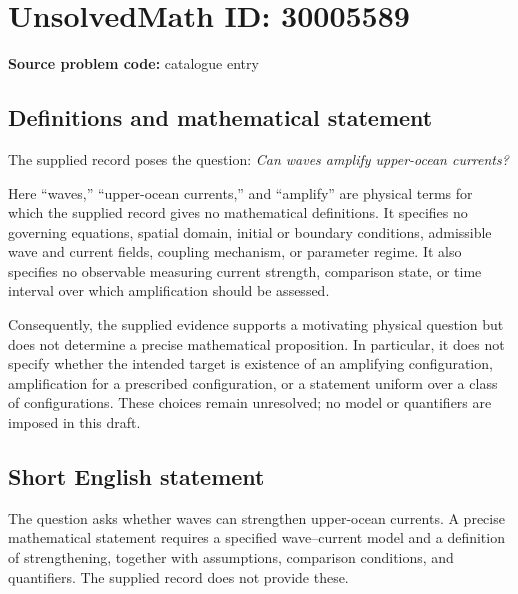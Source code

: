 \documentclass[11pt]{article}
\begin{document}
\section*{UnsolvedMath ID: 30005589}
\textbf{Source problem code:} catalogue entry
\subsection{Definitions and mathematical statement}
The supplied record poses the question: \emph{Can waves amplify upper-ocean currents?}

Here ``waves,'' ``upper-ocean currents,'' and ``amplify'' are physical terms for which the supplied record gives no mathematical definitions. It specifies no governing equations, spatial domain, initial or boundary conditions, admissible wave and current fields, coupling mechanism, or parameter regime. It also specifies no observable measuring current strength, comparison state, or time interval over which amplification should be assessed.

Consequently, the supplied evidence supports a motivating physical question but does not determine a precise mathematical proposition. In particular, it does not specify whether the intended target is existence of an amplifying configuration, amplification for a prescribed configuration, or a statement uniform over a class of configurations. These choices remain unresolved; no model or quantifiers are imposed in this draft.
\subsection{Short English statement}
The question asks whether waves can strengthen upper-ocean currents. A precise mathematical statement requires a specified wave--current model and a definition of strengthening, together with assumptions, comparison conditions, and quantifiers. The supplied record does not provide these.
\end{document}

